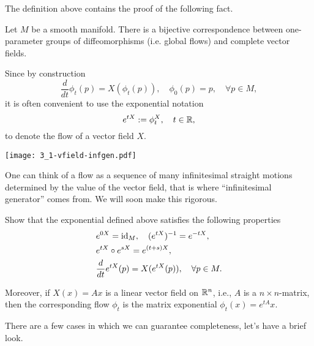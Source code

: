 The definition above contains the proof of the following fact.
\begin{proposition}
	Let $M$ be a smooth manifold. There is a bijective correspondence between one-parameter groups of diffeomorphisms (i.e. global flows) and complete vector fields.
\end{proposition}

\begin{notation}
	Since by construction
	\begin{equation}
		\frac{d}{d t}\phi_t(p) = X(\phi_t(p)), \quad
		\phi_0(p) = p, \quad \forall p\in M,
	\end{equation}
	it is often convenient to use the exponential notation
	\begin{equation}
		e^{t X} := \phi^X_t, \quad t\in\mathbb{R},
	\end{equation}
	to denote the flow of a vector field $X$.
\end{notation}

\begin{marginfigure}
	\texttt{[image: 3\_1-vfield-infgen.pdf]}%
	\caption{One can think of a flow as a sequence of many infinitesimal straight motions determined by the value of the vector field, that is where ``infinitesimal generator'' comes from. We will soon make this rigorous.}%
	\label{fig:3_1-vfield-infgen}
\end{marginfigure}

\begin{exercise}
	Show that the exponential defined above satisfies the following properties
	\begin{align}
		 & e^{0X} = \operatorname{id}_M, \quad (e^{tX})^{-1} = e^{-tX},                 \\
		 & e^{t X}\circ e^{s X}= e^{(t+s)X},                              \\
		 & \frac{d}{d t} e^{tX} (p) = X(e^{tX}(p)), \quad \forall p\in M.
	\end{align}

	Moreover, if $X(x) = Ax$ is a linear vector field on $\mathbb{R}^n$, i.e., $A$ is a $n\times n$-matrix, then the corresponding flow $\phi_t$ is the matrix exponential $\phi_t(x) = e^{tA}x$.
\end{exercise}

There are a few cases in which we can guarantee completeness, let's have a brief look.

